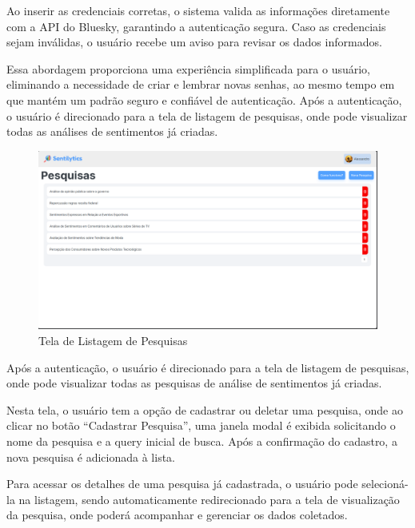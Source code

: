 \documentclass[
	12pt,				%
	oneside,			%
	a4paper,			%
	english,			%
	french,				%
	spanish,			%
	brazil				%
	]{abntex2}
\begin{document}
Ao inserir as credenciais corretas, o sistema valida as informações
diretamente com a API do Bluesky, garantindo a autenticação segura. Caso
as credenciais sejam inválidas, o usuário recebe um aviso para revisar
os dados informados.

Essa abordagem proporciona uma experiência simplificada para o usuário,
eliminando a necessidade de criar e lembrar novas senhas, ao mesmo tempo
em que mantém um padrão seguro e confiável de autenticação. Após a
autenticação, o usuário é direcionado para a tela de listagem de
pesquisas, onde pode visualizar todas as análises de sentimentos já
criadas.

\begin{figure}[htbp]
\hypertarget{tela_listagem_pesquisas}{%
\caption{Tela de Listagem de Pesquisas}\label{tela_listagem_pesquisas}
\begin{center}
\includegraphics[scale=0.2]{imagens/sentilytics/interface-grafica/listagem-pesquisas.png}
\end{center}
}
\end{figure}

Após a autenticação, o usuário é direcionado para a tela de listagem de
pesquisas, onde pode visualizar todas as pesquisas de análise de
sentimentos já criadas.

Nesta tela, o usuário tem a opção de cadastrar ou deletar uma pesquisa,
onde ao clicar no botão ``Cadastrar Pesquisa'', uma janela modal é
exibida solicitando o nome da pesquisa e a query inicial de busca. Após
a confirmação do cadastro, a nova pesquisa é adicionada à lista.

Para acessar os detalhes de uma pesquisa já cadastrada, o usuário pode
selecioná-la na listagem, sendo automaticamente redirecionado para a
tela de visualização da pesquisa, onde poderá acompanhar e gerenciar os
dados coletados.
\end{document}
